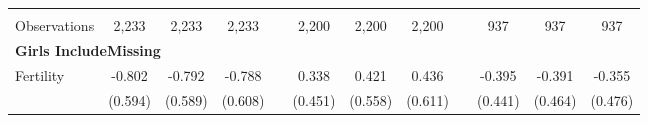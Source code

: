 \begin{landscape}
\begin{table}[htpb!]
\begin{center}
\begin{tabular}{lcccp{2mm}cccp{2mm}ccc}
\begin{footnotesize}\end{footnotesize}&\begin{footnotesize}\end{footnotesize}&\begin{footnotesize}\end{footnotesize}&\begin{footnotesize}\end{footnotesize}&\begin{footnotesize}\end{footnotesize}&\begin{footnotesize}\end{footnotesize}&\begin{footnotesize}\end{footnotesize}&\begin{footnotesize}\end{footnotesize}&\begin{footnotesize}\end{footnotesize}&\begin{footnotesize}\end{footnotesize}&\begin{footnotesize}\end{footnotesize}&\begin{footnotesize}\end{footnotesize}\\Observations&2,233&2,233&2,233&&2,200&2,200&2,200&&937&937&937\\
\multicolumn{12}{l}{\textbf{Girls IncludeMissing}}\\ 
Fertility&-0.802&-0.792&-0.788&&0.338&0.421&0.436&&-0.395&-0.391&-0.355\\
&(0.594)&(0.589)&(0.608)&&(0.451)&(0.558)&(0.611)&&(0.441)&(0.464)&(0.476)\\

\end{tabular}
\end{center}
\end{table}
\end{landscape}
